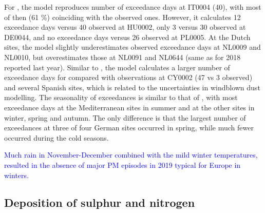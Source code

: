 For \PM[2.5], the model reproduces number of exceedance days at IT0004 (40), with most of then (61 \%) coinciding with the observed ones. However, it calculates 12 exceedance days versus 40 observed at HU0002, only 3 versus 30 observed at DE0044, and no exceedance days versus 26 observed at PL0005. At the Dutch sites, the model slightly underestimates observed \PM[2.5] exceedance days at NL0009 and NL0010, but overestimates those at NL0091 and NL0644 (same as for 2018 reported last year). Similar to \PM[10], the model calculates a larger number of exceedance days for \PM[2.5] compared with observations at CY0002 (47 vs 3 observed) and several Spanish sites, which is related to the uncertainties in windblown dust modelling. The seasonality of \PM[2.5] exceedances is similar to that of \PM[10], with most exceedance days at the Mediterranean sites in summer and at the other sites in winter, spring and autumn. The only difference is that the largest number of \PM[2.5] exceedances at three of four German sites occurred in spring, while much fewer occurred during the cold seasons.


\textcolor{blue}{Much rain in November-December combined with the mild winter temperatures, resulted in the absence of major PM episodes in 2019 typical for Europe in winters.} 




\subsection{Deposition of sulphur and nitrogen} %
\label{subs:dep}


